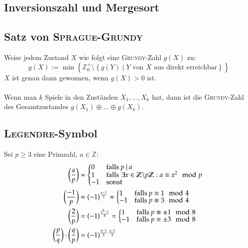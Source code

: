 \subsection{Inversionszahl und Mergesort}


\subsection{Satz von \textsc{Sprague-Grundy}}
Weise jedem Zustand $X$ wie folgt eine \textsc{Grundy}-Zahl $g\left(X\right)$ zu:
\[
	g\left(X\right) := \min\left\{
		\mathbb{Z}_0^+ \setminus
		\left\{g\left(Y\right) \mid Y \text{ von } X \text{ aus direkt erreichbar}\right\}
	\right\} 
\]
$X$ ist genau dann gewonnen, wenn $g\left(X\right) > 0$ ist.\\\\
Wenn man $k$ Spiele in den Zuständen $X_1, \ldots, X_k$ hat, dann ist die \textsc{Grundy}-Zahl des Gesamtzustandes $g\left(X_1\right) \oplus \ldots \oplus g\left(X_k\right)$.

\subsection{\textsc{Legendre}-Symbol}
Sei $p \geq 3$ eine Primzahl, $a \in \mathbb{Z}$:
\begin{align*}
	\legendre{a}{p} &=
	\begin{cases*}
		 0 & falls $p~\vert~a$ \\[-1ex]
		 1 & falls $\exists x \in \mathbb{Z}\backslash p\mathbb{Z} : a \equiv x^2 \mod p$ \\[-1ex]
		-1 & sonst
	\end{cases*} \\
	\legendre{-1}{p} &= (-1)^{\frac{p - 1}{2}} =
	\begin{cases*}
		 1 & falls $p \equiv 1 \mod 4$ \\[-1ex]
		-1 & falls $p \equiv 3 \mod 4$
	\end{cases*} \\
	\legendre{2}{p} &= (-1)^{\frac{p^2 - 1}{8}} =
	\begin{cases*}
		 1 & falls $p \equiv \pm 1 \mod 8$ \\[-1ex]
		-1 & falls $p \equiv \pm 3 \mod 8$
	\end{cases*} \\
	\legendre{p}{q} \cdot \legendre{q}{p} &=
	(-1)^{\frac{p - 1}{2} \cdot \frac{q - 1}{2}}
\end{align*}


